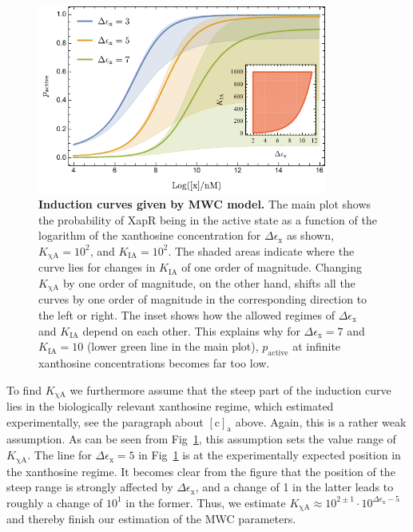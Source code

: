 \documentclass[10pt,letterpaper]{article}
\newcommand{\n}[1]{\mathrm{#1}}
\begin{document}
\begin{figure}
	\centering
	\includegraphics[width=0.85\textwidth]{FigSI3.pdf}
	\caption{{\bf Induction curves given by MWC model.} The main plot shows the probability of XapR being in the active state as a function of the logarithm of the xanthosine concentration for $\Delta \epsilon_{\n{x}}$ as shown, $K_{\n{\chi A}} = 10^{2}$, and $K_{\n{IA}} = 10^{2}$. The shaded areas indicate where the curve lies for changes in $K_{\n{IA}}$ of one order of magnitude. Changing $K_{\n{\chi A}}$ by one order of magnitude, on the other hand, shifts all the curves by one order of magnitude in the corresponding direction to the left or right. The inset shows how the allowed regimes of $\Delta \epsilon_{\n{x}}$ and $K_{\n{IA}}$ depend on each other. This explains why for $\Delta \epsilon_{\n{x}} = 7$ and $K_{\n{IA}}=10$ (lower green line in the main plot), $p_{\n{active}}$ at infinite xanthosine concentrations becomes far too low.}
	\label{figS2:induction}
\end{figure}

To find $K_{\n{\chi A}}$ we furthermore assume that the steep part of the induction curve lies in the biologically relevant xanthosine regime, which estimated experimentally, see the paragraph about $\n{[c]_a}$ above. Again, this is a rather weak assumption. As can be seen from Fig~\ref{figS2:induction}, this assumption sets the value range of $K_{\n{\chi A}}$. The line for $\Delta \epsilon_{\n{x}} = 5$ in Fig~\ref{figS2:induction} is at the experimentally expected position in the xanthosine regime. It becomes clear from the figure that the position of the steep range is strongly affected by $\Delta \epsilon_{\n{x}}$, and a change of 1 in the latter leads to roughly a change of $10^1$ in the former. Thus, we estimate $K_{\n{\chi A}} \approx 10^{2 \pm 1} \cdot 10^{\Delta \epsilon_{\n{x}}-5}$ and thereby finish our estimation of the MWC parameters.
\end{document}

